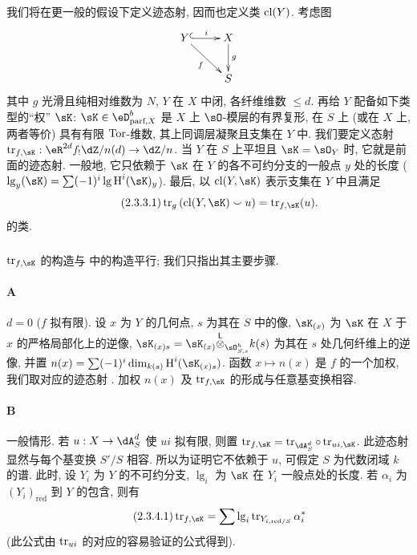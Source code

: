 \subsubsection{}\label{IV:2-3-3}

我们将在更一般的假设下定义迹态射, 因而也定义类 $\operatorname{cl}(Y)$. 考虑图
\[\xymatrix{
  Y \ar@{^{(}->}[r]^-i \ar[dr]_-f
    & X \ar[d]^-g \\
  & S
}\]
其中 $g$ 光滑且纯相对维数为 $N$, $Y$ 在 $X$ 中闭, 各纤维维数 $\leqslant d$.
再给 $Y$ 配备如下类型的“权” $\sK$:
$\sK\in\eD_{\text{parf},X}^b$ 是 $X$ 上 $\sO$-模层的有界复形,
在 $S$ 上 (或在 $X$ 上, 两者等价) 具有有限 $\operatorname{Tor}$-维数,
其上同调层凝聚且支集在 $Y$ 中.
我们要定义态射 $\tr_{f,\sK}:\eR^{2 d}f_! \dZ/n(d) \to \dZ/n$.
当 $Y$ 在 $S$ 上平坦且 $\sK=\sO_Y$ 时, 它就是前面的迹态射.
一般地, 它只依赖于 $\sK$ 在 $Y$ 的各不可约分支的一般点 $y$ 处的长度
($\operatorname{lg}_y(\sK) = \sum (-1)^i \operatorname{lg} \h^i(\sK)_y$).
最后, 以 $\cl(Y,\sK)$ 表示支集在 $Y$ 中且满足
\begin{equation*}\tag{2.3.3.1}\label{IV:eq:2-3-3-1}
  \tr_g\left(\cl(Y,\sK)\smallsmile u\right) = \tr_{f,\sK}(u) \text{.}
\end{equation*}
的类.

\subsubsection{}\label{IV:2-3-4}

$\tr_{f,\sK}$ 的构造与 \cite[XVIII.2]{sga4} 中的构造平行; 我们只指出其主要步骤.

\paragraph{A}
$d=0$ ($f$ 拟有限). 设 $x$ 为 $Y$ 的几何点, $s$ 为其在 $S$ 中的像,
$\sK_{(x)}$ 为 $\sK$ 在 $X$ 于 $x$ 的严格局部化上的逆像,
$\sK_{(x)s} = \sK_{(x)}\lotimes_{\sO_{S,s}^h} k(s)$ 为其在 $s$ 处几何纤维上的逆像,
并置 $n(x)=\sum (-1)^i \dim_{k(s)} \h^i(\sK_{(x)s})$.
函数 $x\mapsto n(x)$ 是 $f$ 的一个加权, 我们取对应的迹态射 \cite[XVII.6.2.5]{sga4}.
加权 $n(x)$ 及 $\tr_{f,\sK}$ 的形成与任意基变换相容.

\paragraph{B}
一般情形. 若 $u:X\to \dA_S^d$ 使 $u i$ 拟有限,
则置 $\tr_{f,\sK} = \tr_{\dA_S^d}\circ \tr_{u i,\sK}$.
此迹态射显然与每个基变换 $S'/S$ 相容.
所以为证明它不依赖于 $u$, 可假定 $S$ 为代数闭域 $k$ 的谱.
此时, 设 $Y_i$ 为 $Y$ 的不可约分支, $\operatorname{lg}_i$ 为 $\sK$ 在 $Y_i$ 一般点处的长度.
若 $\alpha_i$ 为 $(Y_i)_\text{red}$ 到 $Y$ 的包含, 则有
\begin{equation*}\tag{2.3.4.1}\label{IV:eq:2-3-4}
  \tr_{f,\sK} = \sum \operatorname{lg}_i \tr_{Y_{i,\text{red}/S}} \alpha_i^\ast
\end{equation*}
(此公式由 $\operatorname{tr}_{u i}$ 的对应的容易验证的公式得到).

